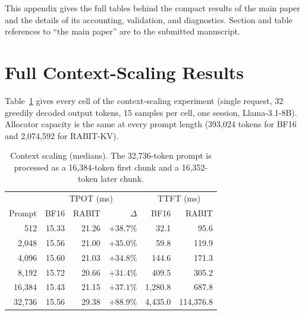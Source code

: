 \documentclass{article}
\begin{document}

\printAffiliationsAndNotice{}

\appendix

This appendix gives the full tables behind the compact results of the main paper and the details of
its accounting, validation, and diagnostics. Section and table references to ``the main paper'' are
to the submitted manuscript.

\section{Full Context-Scaling Results}
\label{app:context}

Table~\ref{tab:app-context} gives every cell of the context-scaling experiment (single request, 32
greedily decoded output tokens, 15 samples per cell, one session, Llama-3.1-8B). Allocator capacity is
the same at every prompt length (393,024 tokens for BF16 and 2,074,592 for RABIT-KV).

\begin{table}[h]
\centering
\small
\setlength{\tabcolsep}{3.5pt}
\begin{tabular}{@{}rrrrrr@{}}
\toprule
 & \multicolumn{3}{c}{TPOT (ms)} & \multicolumn{2}{c}{TTFT (ms)} \\
Prompt & BF16 & RABIT & $\Delta$ & BF16 & RABIT \\
\midrule
512 & 15.33 & 21.26 & $+38.7\%$ & 32.1 & 95.6 \\
2,048 & 15.56 & 21.00 & $+35.0\%$ & 59.8 & 119.9 \\
4,096 & 15.60 & 21.03 & $+34.8\%$ & 144.6 & 171.3 \\
8,192 & 15.72 & 20.66 & $+31.4\%$ & 409.5 & 305.2 \\
16,384 & 15.43 & 21.15 & $+37.1\%$ & 1,280.8 & 687.8 \\
32,736 & 15.56 & 29.38 & $+88.9\%$ & 4,435.0 & 114,376.8 \\
\bottomrule
\end{tabular}
\caption{Context scaling (medians). The 32,736-token prompt is processed as a 16,384-token first chunk
and a 16,352-token later chunk.}
\label{tab:app-context}
\end{table}
\end{document}
